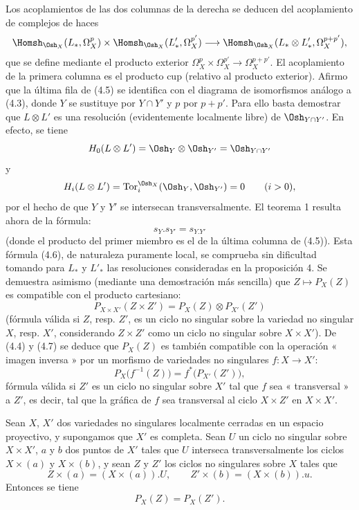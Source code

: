 Los acoplamientos de las dos columnas de la derecha se deducen del acoplamiento de
complejos de haces
\[
\Homsh_{\Osh_X}(L_{*},\Omega_X^{p})
\times\Homsh_{\Osh_X}(L'_{*},\Omega_X^{p'})
\longrightarrow
\Homsh_{\Osh_X}(L_{*}\otimes L'_{*},\Omega_X^{p+p'}),
\]
que se define mediante el producto exterior
$\Omega_X^{p}\times\Omega_X^{p'}\longrightarrow\Omega_X^{p+p'}$.
El acoplamiento de la primera columna es el producto cup (relativo al producto
exterior). Afirmo que la última fila de (4.5) se identifica con el diagrama
de isomorfismos análogo a (4.3), donde $Y$ se sustituye por $Y\cap Y'$ y $p$ por
$p+p'$. Para ello basta demostrar que $L\otimes L'$ es una resolución
(evidentemente localmente libre) de $\Osh_{Y\cap Y'}$. En efecto, se tiene
\[
  H_0(L\otimes L')=\Osh_Y\otimes\Osh_{Y'}=\Osh_{Y\cap Y'}
\]
y
\[
  H_i(L\otimes L')=\operatorname{Tor}_{i}^{\Osh_X}(\Osh_Y,\Osh_{Y'})=0
  \qquad(i>0),
\]
por el hecho de que $Y$ y $Y'$ se intersecan transversalmente. El teorema 1 resulta
ahora de la fórmula:
\begin{equation}\tag{4.6}
  s_Y.s_{Y'}=s_{Y.Y'}
\end{equation}
(donde el producto del primer miembro es el de la última columna de (4.5)).
Esta fórmula (4.6), de naturaleza puramente local, se comprueba sin dificultad
tomando para $L_{*}$ y $L'_{*}$ las resoluciones consideradas en la proposición
4. Se demuestra asimismo (mediante una demostración más sencilla) que
$Z\longmapsto P_X(Z)$ es compatible con el producto cartesiano:
\begin{equation}\tag{4.7}
  P_{X\times X'}(Z\times Z')=P_X(Z)\otimes P_{X'}(Z')
\end{equation}
(fórmula válida si $Z$, resp. $Z'$, es un ciclo no singular sobre la variedad
no singular $X$, resp. $X'$, considerando $Z\times Z'$ como un ciclo no
singular sobre $X\times X'$). De (4.4) y (4.7) se deduce que $P_X(Z)$ es también
compatible con la operación « imagen inversa » por un morfismo de variedades no
singulares $f:X\longrightarrow X'$:
\begin{equation}\tag{4.8}
  P_X\bigl(f^{-1}(Z)\bigr)=f^{*}\bigl(P_{X'}(Z')\bigr),
\end{equation}
fórmula válida si $Z'$ es un ciclo no singular sobre $X'$ tal que $f$ sea
« transversal » a $Z'$, es decir, tal que la gráfica de $f$ sea transversal al ciclo
$X\times Z'$ en $X\times X'$.

 Sean $X$, $X'$ dos variedades no singulares
localmente cerradas en un espacio proyectivo, y supongamos que $X'$ es completa. Sean $U$
un ciclo no singular sobre $X\times X'$, $a$ y $b$ dos puntos de $X'$ tales que
$U$ interseca transversalmente los ciclos $X\times(a)$ y $X\times(b)$, y sean $Z$
y $Z'$ los ciclos no singulares sobre $X$ tales que
\[
  Z\times(a)=(X\times(a)).U,
  \qquad
  Z'\times(b)=(X\times(b)).u.
\]
Entonces se tiene
\[
  P_X(Z)=P_X(Z').
\]

